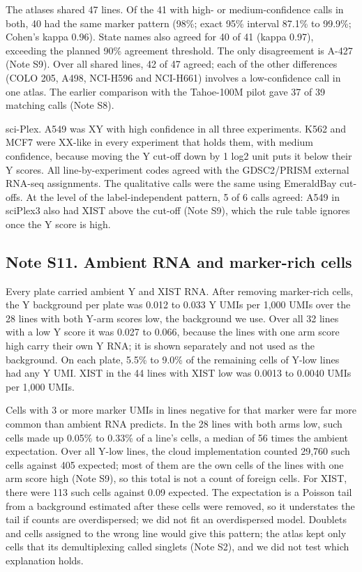 \documentclass[
  11pt,
  letterpaper,
]{article}
\begin{document}
The atlases shared 47 lines. Of the 41 with high- or medium-confidence
calls in both, 40 had the same marker pattern (98\%; exact 95\% interval
87.1\% to 99.9\%; Cohen's kappa 0.96). State names also agreed for 40 of
41 (kappa 0.97), exceeding the planned 90\% agreement threshold.
The only disagreement is A-427 (Note
S9). Over all shared lines, 42 of 47 agreed; each of the other
differences (COLO 205, A498, NCI-H596 and NCI-H661) involves a
low-confidence call in one atlas. The earlier comparison with the
Tahoe-100M pilot gave 37 of 39 matching calls (Note S8).

sci-Plex. A549 was XY with high confidence in all three experiments.
K562 and MCF7 were XX-like in every experiment that holds them, with
medium confidence, because moving the Y cut-off down by 1 log2 unit puts
it below their Y scores. All line-by-experiment codes agreed with the
GDSC2/PRISM external RNA-seq assignments. The qualitative calls were the
same using EmeraldBay cut-offs. At the level of the label-independent
pattern, 5 of 6 calls agreed: A549 in sciPlex3 also had XIST above the
cut-off (Note S9), which the rule table ignores once the Y score is
high.

\subsection{Note S11. Ambient RNA and marker-rich
cells}\label{note-s11.-ambient-rna-and-marker-rich-cells}

Every plate carried ambient Y and XIST RNA. After removing marker-rich
cells, the Y background per plate was 0.012 to 0.033 Y UMIs per 1,000
UMIs over the 28 lines with both Y-arm scores low, the background we
use. Over all 32 lines with a low Y score it was 0.027 to 0.066, because
the lines with one arm score high carry their own Y RNA; it is shown
separately and not used as the background. On each plate, 5.5\% to 9.0\%
of the remaining cells of Y-low lines had any Y UMI. XIST in the 44
lines with XIST low was 0.0013 to 0.0040 UMIs per 1,000 UMIs.

Cells with 3 or more marker UMIs in lines negative for that marker were
far more common than ambient RNA predicts. In the 28 lines with both
arms low, such cells made up 0.05\% to 0.33\% of a line's cells, a
median of 56 times the ambient expectation. Over all Y-low lines, the
cloud implementation counted 29,760 such cells against 405 expected;
most of them are the own cells of the lines with one arm score high
(Note S9), so this total is not a count of foreign cells. For XIST,
there were 113 such cells against 0.09 expected. The expectation is a
Poisson tail from a background estimated after these cells were removed,
so it understates the tail if counts are overdispersed; we did not fit
an overdispersed model. Doublets and cells assigned to the wrong line
would give this pattern; the atlas kept only cells that its
demultiplexing called singlets (Note S2), and we did not test which
explanation holds.
\end{document}
